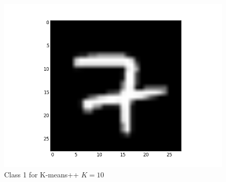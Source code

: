 \documentclass[submit]{harvardml}
\begin{document}
\begin{figure}[ht]
    \includegraphics[scale=0.20]{K10-representative-0-2}
    \caption{Class 1 for K-means++ $K=10$}
\end{figure}
\end{document}
